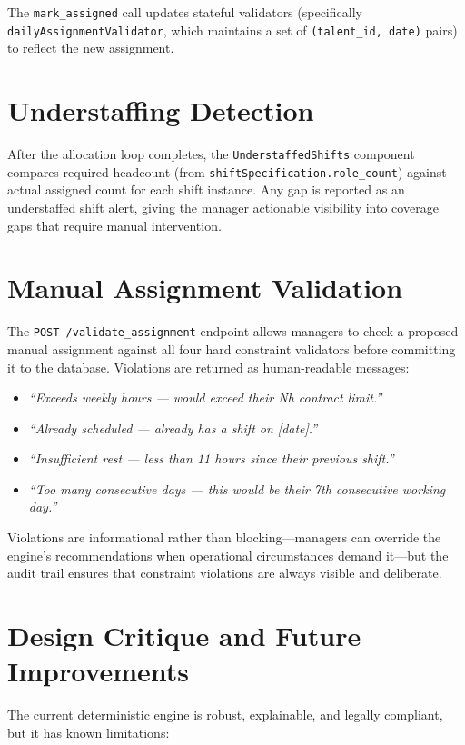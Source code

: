 The \texttt{mark\_assigned} call updates stateful validators (specifically \texttt{dailyAssignmentValidator}, which maintains a set of \texttt{(talent\_id, date)} pairs) to reflect the new assignment.

\section{Understaffing Detection}

After the allocation loop completes, the \texttt{UnderstaffedShifts} component compares required headcount (from \texttt{shiftSpecification.role\_count}) against actual assigned count for each shift instance. Any gap is reported as an understaffed shift alert, giving the manager actionable visibility into coverage gaps that require manual intervention.

\section{Manual Assignment Validation}

The \texttt{POST /validate\_assignment} endpoint allows managers to check a proposed manual assignment against all four hard constraint validators before committing it to the database. Violations are returned as human-readable messages:

\begin{itemize}
    \item \textit{``Exceeds weekly hours — would exceed their Nh contract limit.''}
    \item \textit{``Already scheduled — already has a shift on [date].''}
    \item \textit{``Insufficient rest — less than 11 hours since their previous shift.''}
    \item \textit{``Too many consecutive days — this would be their 7th consecutive working day.''}
\end{itemize}

Violations are informational rather than blocking—managers can override the engine's recommendations when operational circumstances demand it—but the audit trail ensures that constraint violations are always visible and deliberate.

\section{Design Critique and Future Improvements}

The current deterministic engine is robust, explainable, and legally compliant, but it has known limitations:

